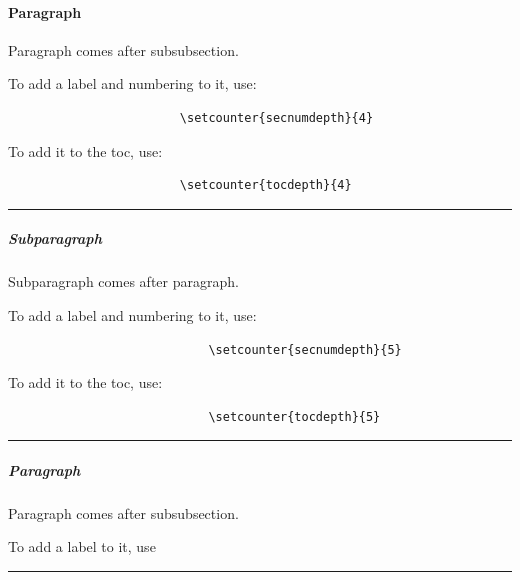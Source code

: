 \documentclass[12pt]{article}
\begin{document}
            \paragraph{Paragraph}

                \begin{remark} \label{rem-paragraph}
                    Paragraph comes after subsubsection.

                    To add a label and numbering to it, use:

                    \begin{lstlisting}
                        \setcounter{secnumdepth}{4}
                    \end{lstlisting}

                    To add it to the toc, use:

                    \begin{lstlisting}
                        \setcounter{tocdepth}{4}
                    \end{lstlisting}

                \end{remark}\hrule

                \subparagraph{Subparagraph}

                    \begin{remark} \label{rem-subparagraph}
                        Subparagraph comes after paragraph.

                        To add a label and numbering to it, use:

                        \begin{lstlisting}
                            \setcounter{secnumdepth}{5}
                        \end{lstlisting}

                        To add it to the toc, use:

                        \begin{lstlisting}
                            \setcounter{tocdepth}{5}
                        \end{lstlisting}

                    \end{remark}\hrule

                    \subparagraph{Paragraph}

                    \begin{remark} \label{paragraph}
                        Paragraph comes after subsubsection.

                        To add a label to it, use \setcounter{secnumdepth}{4}
                    \end{remark}\hrule
\end{document}
